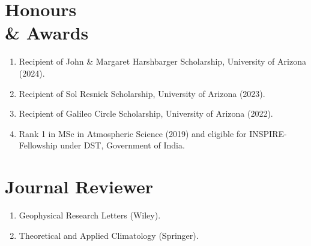 \documentclass[margin,line]{resume}
\begin{document}
\begin{resume}
		
		\vspace*{-3mm}
				
		\section{\mysidestyle \textbf{\textcolor{sep}{Honours \\\& Awards}}}
		\begin{enumerate}[topsep=0.1pt, partopsep=1pt, itemsep=0.1pt, parsep=0.1pt, leftmargin=12pt,label=\roman{*})]
			\item Recipient of John \& Margaret Harshbarger Scholarship, University of Arizona (2024).
			\item Recipient of Sol Resnick Scholarship, University of Arizona (2023).
			\item Recipient of Galileo Circle Scholarship, University of Arizona (2022).
			\item Rank 1 in MSc in Atmospheric Science (2019) and eligible for INSPIRE-Fellowship under DST, Government of India.
			
		\end{enumerate} 
		\vspace*{-3mm}
	
		\section{\mysidestyle \textbf{\textcolor{sep}{Journal Reviewer}}}
		\begin{enumerate}[topsep=0.1pt, partopsep=1pt, itemsep=0.1pt, parsep=0.1pt, leftmargin=12pt,label=\roman{*})]
			\item Geophysical Research Letters (Wiley).
			\item Theoretical and Applied Climatology (Springer).
			

\end{enumerate}
\end{resume}
\end{document}
